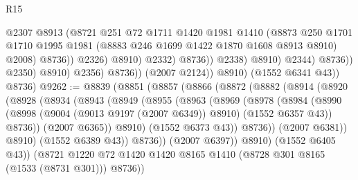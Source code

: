 \begin{lexlean}{R15}
\begin{coremodule}
                                            @2307
                                            @8913
                                            (@8721
                                              @251
                                              @72
                                              @1711
                                              @1420
                                              @1981
                                              @1410
                                              (@8873
                                                @250
                                                @1701
                                                @1710
                                                @1995
                                                @1981
                                                (@8883 @246 @1699 @1422 @1870 @1608 @8913 @8910)
                                                @2008)
                                              @8736))
                                          @2326)
                                        @8910)
                                      @2332)
                                    @8736))
                                @2338)
                              @8910)
                            @2344)
                          @8736))
                      @2350)
                    @8910)
                  @2356)
                @8736))
            (@2007 @2124))
          @8910)
        (@1552 @6341 @43))
      @8736)
@9262 := @8839
    (@8851
      (@8857
        (@8866
          (@8872
            (@8882
              (@8914
                (@8920
                  (@8928
                    (@8934
                      (@8943
                        (@8949
                          (@8955
                            (@8963
                              (@8969
                                (@8978
                                  (@8984
                                    (@8990
                                      (@8998
                                        (@9004 (@9013 @9197 (@2007 @6349)) @8910)
                                        (@1552 @6357 @43))
                                      @8736))
                                  (@2007 @6365))
                                @8910)
                              (@1552 @6373 @43))
                            @8736))
                        (@2007 @6381))
                      @8910)
                    (@1552 @6389 @43))
                  @8736))
              (@2007 @6397))
            @8910)
          (@1552 @6405 @43))
        (@8721 @1220 @72 @1420 @1420 @8165 @1410 (@8728 @301 @8165 (@1533 (@8731 @301))) @8736))

\end{coremodule}
\end{lexlean}
